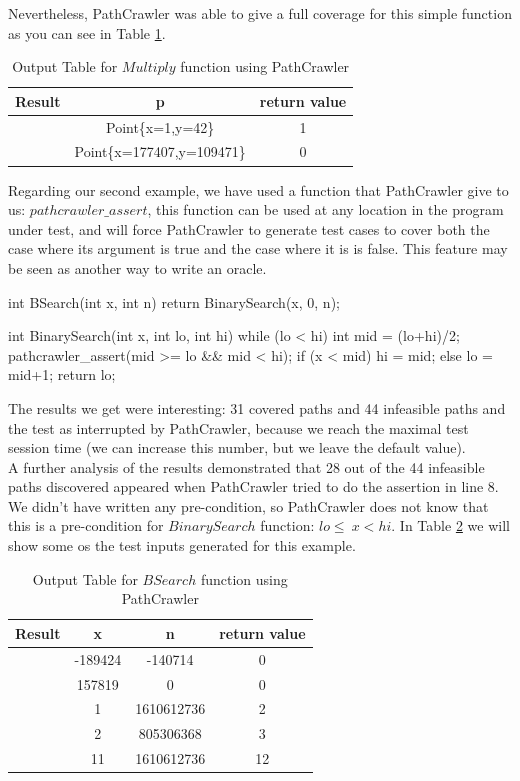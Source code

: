 \documentclass[10pt, conference, compsocconf]{IEEEtran}
\newcommand{\checkK}{\color{ForestGreen}\checkmark}
\begin{document}
Nevertheless, PathCrawler was able to give a full coverage for this simple function as you can see in Table \ref{tab:mul}.

\begin{table}[!ht]
\renewcommand{\arraystretch}{1.3}
\setlength{\tabcolsep}{10pt}
\caption{Output Table for $Multiply$ function using PathCrawler}
\label{tab:mul}
\centering
\noindent \begin{tabular}{|c|c|c|}\hline
Result & p & return value\\\hline
\checkK & Point\{x=1,y=42\} & 1 \\\hline
\checkK & Point\{x=177407,y=109471\} & 0 \\\hline
\end{tabular}
\end{table}

Regarding our second example, we have used a function that PathCrawler give to us: $pathcrawler\_assert$, this function can be used at any location in the
program under test, and will force PathCrawler to generate test cases to cover both the case where its argument is true and the case where it is is false.
This feature may be seen as another way to write an oracle.

\begin{code}
int BSearch(int x, int n) {
    return BinarySearch(x, 0, n); 
}
	
int BinarySearch(int x, int lo, int hi) {
    while (lo < hi) {
        int mid = (lo+hi)/2;
        pathcrawler_assert(mid >= lo && mid < hi);
        if (x < mid) { hi = mid; }
		else { lo = mid+1; }
    }
    return lo; 
}
\end{code}

The results we get were interesting: 31 covered paths and 44 infeasible paths and the test as interrupted by PathCrawler,
because we reach the maximal test session time (we can increase this number, but we leave the default value).\\
A further analysis of the results demonstrated that 28 out of the 44 infeasible paths discovered appeared when PathCrawler tried to
do the assertion in line 8. We didn't have written any pre-condition, so PathCrawler does not know that this is a pre-condition
for $BinarySearch$ function:  $lo\leq~x<hi$. In Table \ref{tab:bsearch} we will show some os the test inputs generated for this example.

\begin{table}[!ht]
\renewcommand{\arraystretch}{1.3}
\caption{Output Table for $BSearch$ function using PathCrawler}
\label{tab:bsearch}
\centering
\noindent \begin{tabular}{|c|c|c|c|}\hline
Result & x & n & return value \\\hline
\checkK & -189424 & -140714 & 0 \\\hline
\checkK & 157819 & 0 & 0 \\\hline
\checkK & 1 & 1610612736 & 2 \\\hline
\checkK & 2 & 805306368 & 3 \\\hline
\checkK & 11 & 1610612736 & 12 \\\hline
\end{tabular}
\end{table}
\end{document}
